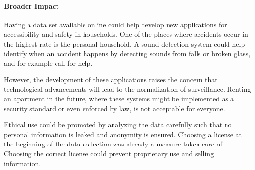 \documentclass{article}
\begin{document}
\paragraph{Broader Impact} Having a data set available online could help develop new applications for accessibility and safety in households. One of the places where accidents occur in the highest rate is the personal household. A sound detection system could help identify when an accident happens by detecting sounds from falls or broken glass, and for example call for help. 

However, the development of these applications raises the concern that technological advancements will lead to the normalization of surveillance. Renting an apartment in the future, where these systems might be implemented as a security standard or even enforced by law, is not acceptable for everyone.

Ethical use could be promoted by analyzing the data carefully such that no personal information is leaked and anonymity is ensured. Choosing a license at the beginning of the data collection was already a measure taken care of. Choosing the correct license could prevent proprietary use and selling information.



\end{document}

